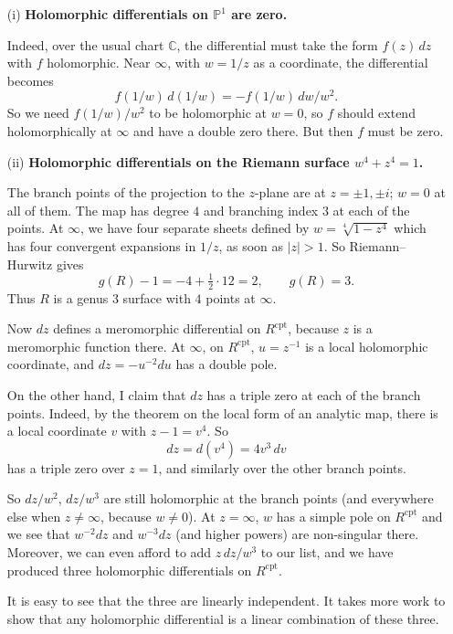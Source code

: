 \documentclass[12pt]{article}
\begin{document}
\begin{example}
    \leavevmode
\begin{enumerate}
\item[(i)] \textbf{Holomorphic differentials on $\mathbb{P}^1$ are zero.}

Indeed, over the usual chart $\mathbb{C}$, the differential must take the form $f(z)\,dz$ with $f$ holomorphic.  
Near $\infty$, with $w = 1/z$ as a coordinate, the differential becomes
\[
f(1/w)\,d(1/w) = -f(1/w)\,dw/w^2.
\]
So we need $f(1/w)/w^2$ to be holomorphic at $w = 0$, so $f$ should extend holomorphically at $\infty$ and have a double zero there.  
But then $f$ must be zero.

\item[(ii)] \textbf{Holomorphic differentials on the Riemann surface $w^4 + z^4 = 1$.}

The branch points of the projection to the $z$-plane are at $z = \pm1, \pm i$; $w = 0$ at all of them.  
The map has degree $4$ and branching index $3$ at each of the points.  
At $\infty$, we have four separate sheets defined by $w = \sqrt[4]{1 - z^4}$ which has four convergent expansions in $1/z$, as soon as $|z| > 1$.  
So Riemann–Hurwitz gives
\[
g(R) - 1 = -4 + \tfrac{1}{2} \cdot 12 = 2, \qquad g(R) = 3.
\]
Thus $R$ is a genus $3$ surface with $4$ points at $\infty$.

Now $dz$ defines a meromorphic differential on $R^{\mathrm{cpt}}$, because $z$ is a meromorphic function there.  
At $\infty$, on $R^{\mathrm{cpt}}$, $u = z^{-1}$ is a local holomorphic coordinate, and $dz = -u^{-2}du$ has a double pole.

On the other hand, I claim that $dz$ has a triple zero at each of the branch points.  
Indeed, by the theorem on the local form of an analytic map, there is a local coordinate $v$ with $z - 1 = v^4$.  
So
\[
dz = d(v^4) = 4v^3\,dv
\]
has a triple zero over $z = 1$, and similarly over the other branch points.

So $dz/w^2$, $dz/w^3$ are still holomorphic at the branch points (and everywhere else when $z \neq \infty$, because $w \neq 0$).  
At $z = \infty$, $w$ has a simple pole on $R^{\mathrm{cpt}}$ and we see that $w^{-2}dz$ and $w^{-3}dz$ (and higher powers) are non-singular there.  
Moreover, we can even afford to add $z\,dz/w^3$ to our list, and we have produced three holomorphic differentials on $R^{\mathrm{cpt}}$.


\begin{remark}
It is easy to see that the three are linearly independent.  
It takes more work to show that any holomorphic differential is a linear combination of these three.
\end{remark}


\end{enumerate}
\end{example}
\end{document}
